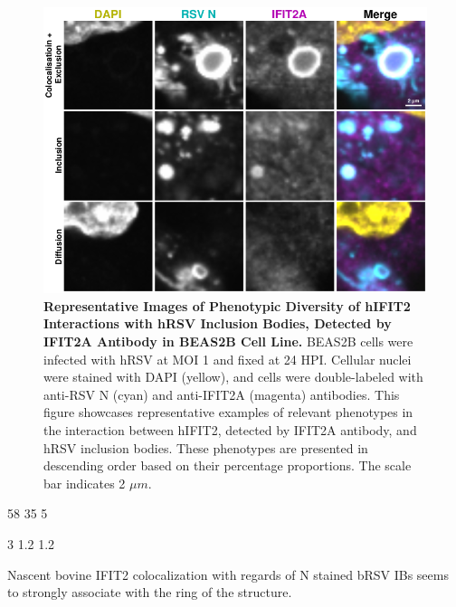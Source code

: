 \begin{figure}
    \centering
    \includegraphics[width=1\linewidth]{08. Chapter 3/Figs/02. Infection/02. IFIT2/01. IFIT2A/12. i2a beas2b.pdf} 
    \caption[Representative Images of Phenotypic Diversity of hIFIT2 Interactions with hRSV Inclusion Bodies, Detected by IFIT2A Antibody in BEAS2B Cell Line.]{\textbf{Representative Images of Phenotypic Diversity of hIFIT2 Interactions with hRSV Inclusion Bodies, Detected by IFIT2A Antibody in BEAS2B Cell Line.} BEAS2B cells were infected with hRSV at MOI 1 and fixed at 24 HPI. Cellular nuclei were stained with DAPI (yellow), and cells were double-labeled with anti-RSV N (cyan) and anti-IFIT2A (magenta) antibodies. This figure showcases representative examples of relevant phenotypes in the interaction between hIFIT2, detected by IFIT2A antibody, and hRSV inclusion bodies. These phenotypes are presented in descending order based on their percentage proportions. The scale bar indicates 2 \(\mu m\).}
    \label{fig:Representative Images of Phenotypic Diversity of hIFIT2 Interactions with hRSV Inclusion Bodies, Detected by IFIT2A Antibody in BEAS2B Cell Line}
\end{figure}

58 35 5

3 1.2 1.2


Nascent bovine IFIT2 colocalization with regards of N stained bRSV IBs seems to strongly associate with the ring of the structure.

